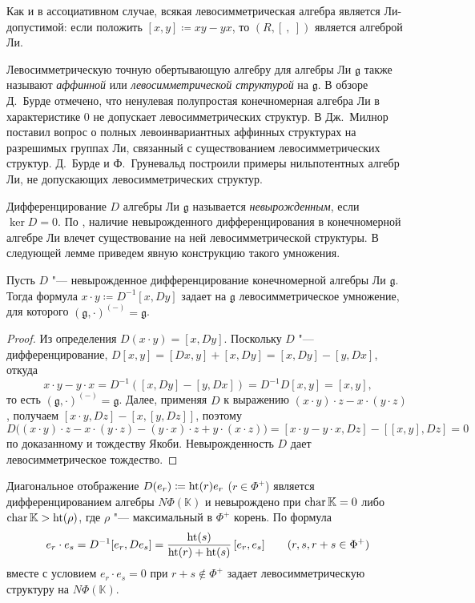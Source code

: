 \documentclass[a4paper,14pt,oneside,openany]{memoir}
\begin{document}
Как и в ассоциативном случае, всякая левосимметрическая алгебра является
Ли-допустимой: если положить $[x,y]\coloneq xy-yx$, то $(R,[\ ,\ ])$ является
алгеброй Ли.

Левосимметрическую точную обертывающую алгебру для алгебры Ли $\mathfrak{g}$
также называют \emph{аффинной} или \emph{левосимметрической структурой} на
$\mathfrak{g}$. В обзоре Д.~Бурде \cite{burde-pre-lie-survey} отмечено, что
ненулевая полупростая конечномерная алгебра Ли в характеристике 0 не допускает
левосимметрических структур. В \cite[\S~4]{milnor-left-sym} Дж.~Милнор поставил
вопрос о полных левоинвариантных аффинных структурах на разрешимых группах Ли,
связанный с существованием левосимметрических структур. Д.~Бурде и
Ф.~Груневальд \cite{burde-counter-example} построили примеры нильпотентных
алгебр Ли, не допускающих левосимметрических структур.

\medskip

Дифференцирование $D$ алгебры Ли $\mathfrak{g}$ называется
\emph{невырожденным}, если $\ker D = 0$. По
\cite[следствие~3.4]{burde-pre-lie-survey}, наличие невырожденного
дифференцирования в конечномерной алгебре Ли влечет существование на ней
левосимметрической структуры. В следующей лемме приведем явную конструкцию
такого умножения.
\begin{lemma}\label{l:nonsing-deriv-pre-lie}
    Пусть $D$ "--- невырожденное дифференцирование конечномерной алгебры Ли
    $\mathfrak{g}$. Тогда формула $x \cdot y \coloneq D^{-1}[x, Dy]$ задает на
    $\mathfrak{g}$ левосимметрическое умножение, для которого $(\mathfrak{g},
    \cdot)^{(-)} = \mathfrak{g}$.
\end{lemma}
\begin{proof}
    Из определения $D(x \cdot y) = [x, Dy]$. Поскольку $D$ "--- дифференцирование,
    $D[x, y] = [Dx, y] + [x, Dy] = [x, Dy] - [y, Dx]$, откуда
    \[
        x \cdot y - y \cdot x = D^{-1}([x, Dy] - [y, Dx]) = D^{-1} D[x, y] = [x, y],
    \]
    то есть $(\mathfrak{g}, \cdot)^{(-)} = \mathfrak{g}$. Далее, применяя $D$ к
    выражению $(x \cdot y) \cdot z - x \cdot (y \cdot z)$, получаем $[x \cdot y,
    Dz] - [x, [y, Dz]]$, поэтому
    \[
        D\bigl((x \cdot y) \cdot z - x \cdot (y \cdot z) - (y \cdot x) \cdot z
        + y \cdot (x \cdot z)\bigr)
        = [x \cdot y - y \cdot x, Dz] - [[x, y], Dz] = 0
    \]
    по доказанному и тождеству Якоби. Невырожденность $D$ дает левосимметрическое
    тождество.
\end{proof}
%
Диагональное отображение $D(e_r) \coloneq \operatorname{ht}(r) e_r$ ($r \in \Phi^+$)
является дифференцированием алгебры $N\Phi(\mathbb{K})$ и невырождено при
$\operatorname{char}\mathbb{K} = 0$ либо $\operatorname{char}\mathbb{K} > \operatorname{ht}(\rho)$, где $\rho$ "---
максимальный в $\Phi^+$ корень. По  формула
\[
    e_r \cdot e_s = D^{-1}[e_r, D e_s] =
    \frac{\operatorname{ht}(s)}{\operatorname{ht}(r) + \operatorname{ht}(s)}\, [e_r, e_s]
    \qquad (r, s, r+s \in \Phi^+)
\]
вместе с условием $e_r\cdot e_s=0$ при $r+s\notin\Phi^+$ задает
левосимметрическую структуру на $N\Phi(\mathbb{K})$.
\end{document}
